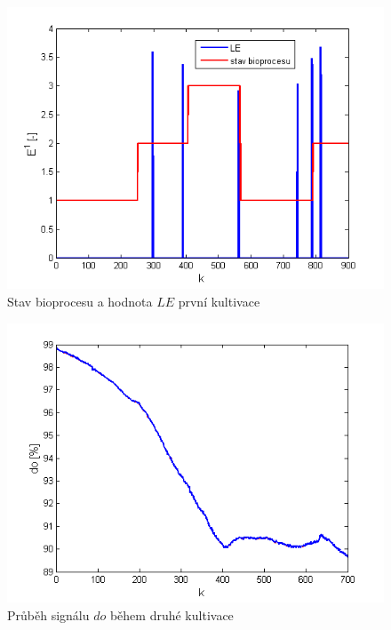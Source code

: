 \begin{figure}
    \centering
    \includegraphics[scale=0.8]{IMG/artep/artep17_4.png}
    \caption{Stav bioprocesu a hodnota $LE$ první kultivace}
    \label{fig:artep_5}
\end{figure}

\begin{figure}
    \centering
    \includegraphics[scale=0.8]{IMG/artep/artep17_2.png}
    \caption{Průběh signálu $do$ během druhé kultivace}
    \label{fig:artep_2}
\end{figure}

